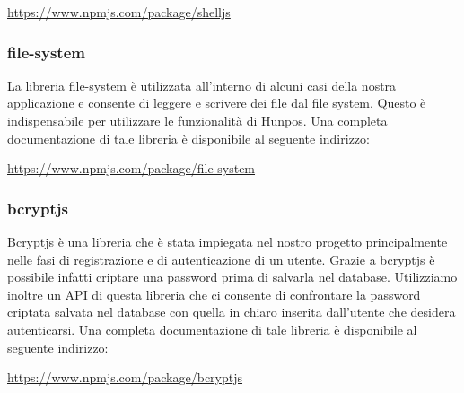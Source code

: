 \begin{center}
	\url{https://www.npmjs.com/package/shelljs}
\end{center}
\subsubsection{file-system}
La libreria file-system è utilizzata all'interno di alcuni casi della nostra applicazione e consente di leggere e scrivere dei file dal file system. Questo è indispensabile per utilizzare le funzionalità di Hunpos.
Una completa documentazione di tale libreria è disponibile al seguente indirizzo:

\begin{center}
	\url{https://www.npmjs.com/package/file-system}
\end{center}
\subsubsection{bcryptjs}
Bcryptjs è una libreria che è stata impiegata nel nostro progetto principalmente nelle fasi di registrazione e di autenticazione di un utente. Grazie a bcryptjs è possibile infatti criptare una password prima di salvarla nel database. Utilizziamo inoltre un API di questa libreria che ci consente di confrontare la password criptata salvata nel database con quella in chiaro inserita dall'utente che desidera autenticarsi.
Una completa documentazione di tale libreria è disponibile al seguente indirizzo:

\begin{center}
	\url{https://www.npmjs.com/package/bcryptjs}
\end{center}